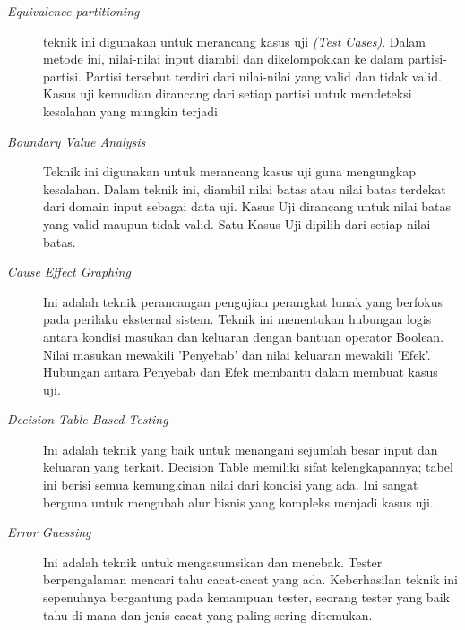 \begin{description}
	\item[\textit{Equivalence partitioning}]teknik ini digunakan untuk merancang kasus uji \textit{(Test Cases)}. Dalam metode ini, nilai-nilai input diambil dan dikelompokkan ke dalam partisi-partisi. Partisi tersebut terdiri dari nilai-nilai yang valid dan tidak valid. Kasus uji kemudian dirancang dari setiap partisi untuk mendeteksi kesalahan yang mungkin terjadi
	\item[\textit{Boundary Value Analysis}]Teknik ini digunakan untuk merancang kasus uji guna mengungkap kesalahan. Dalam teknik ini, diambil nilai batas atau nilai batas terdekat dari domain input sebagai data uji. Kasus Uji dirancang untuk nilai batas yang valid maupun tidak valid. Satu Kasus Uji dipilih dari setiap nilai batas.
	\item[\textit{Cause Effect Graphing}]Ini adalah teknik perancangan pengujian perangkat lunak yang berfokus pada perilaku eksternal sistem. Teknik ini menentukan hubungan logis antara kondisi masukan dan keluaran dengan bantuan operator Boolean. Nilai masukan mewakili 'Penyebab' dan nilai keluaran mewakili 'Efek'. Hubungan antara Penyebab dan Efek membantu dalam membuat kasus uji.
	\item[\textit{Decision Table Based Testing}]Ini adalah teknik yang baik untuk menangani sejumlah besar input dan keluaran yang terkait. Decision Table memiliki sifat kelengkapannya; tabel ini berisi semua kemungkinan nilai dari kondisi yang ada. Ini sangat berguna untuk mengubah alur bisnis yang kompleks menjadi kasus uji.
	\item[\textit{Error Guessing}]Ini adalah teknik untuk mengasumsikan dan menebak. Tester berpengalaman mencari tahu cacat-cacat yang ada. Keberhasilan teknik ini sepenuhnya bergantung pada kemampuan tester, seorang tester yang baik tahu di mana dan jenis cacat yang paling sering ditemukan.
\end{description}

